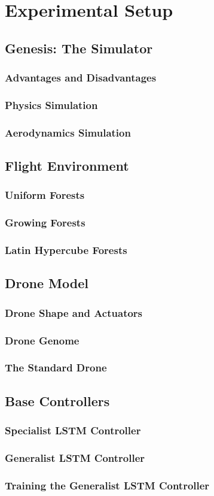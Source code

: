 \chapter{Experimental Setup}
\section{Genesis: The Simulator}
\subsection{Advantages and Disadvantages}
\subsection{Physics Simulation}
\subsection{Aerodynamics Simulation}

\section{Flight Environment}
\subsection{Uniform Forests}
\subsection{Growing Forests}
\subsection{Latin Hypercube Forests}

\section{Drone Model}
\subsection{Drone Shape and Actuators}
\subsection{Drone Genome}
\subsection{The Standard Drone}

\section{Base Controllers}
\subsection{Specialist LSTM Controller}
\subsection{Generalist LSTM Controller}
\subsection{Training the Generalist LSTM Controller}
